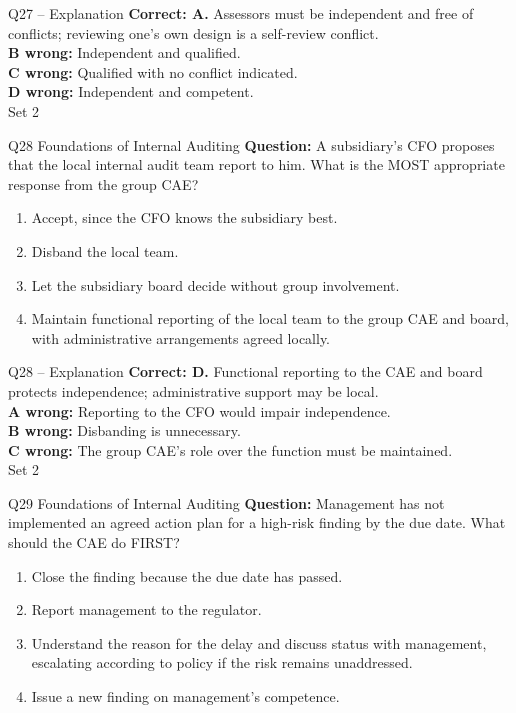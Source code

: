 \documentclass[aspectratio=169,10pt]{beamer}
\begin{document}
\begin{frame}[t]{Q27 -- Explanation}
	\footnotesize
	\textbf{Correct: A.} Assessors must be independent and free of conflicts; reviewing one's own design is a self-review conflict. \\[5pt]
\textbf{B wrong:} Independent and qualified. \\[3pt]
\textbf{C wrong:} Qualified with no conflict indicated. \\[3pt]
\textbf{D wrong:} Independent and competent. \\[3pt]
	\vfill {\tiny Set 2}
\end{frame}

\begin{frame}[t]{Q28 \hfill {\scriptsize Foundations of Internal Auditing}}
	\small
	\textbf{Question:} A subsidiary's CFO proposes that the local internal audit team report to him. What is the MOST appropriate response from the group CAE?
	\begin{enumerate}[label=\Alph*.,itemsep=1pt,topsep=3pt]
			\item Accept, since the CFO knows the subsidiary best.
			\item Disband the local team.
			\item Let the subsidiary board decide without group involvement.
			\item Maintain functional reporting of the local team to the group CAE and board, with administrative arrangements agreed locally.
	\end{enumerate}
\end{frame}

\begin{frame}[t]{Q28 -- Explanation}
	\footnotesize
	\textbf{Correct: D.} Functional reporting to the CAE and board protects independence; administrative support may be local. \\[5pt]
\textbf{A wrong:} Reporting to the CFO would impair independence. \\[3pt]
\textbf{B wrong:} Disbanding is unnecessary. \\[3pt]
\textbf{C wrong:} The group CAE's role over the function must be maintained. \\[3pt]
	\vfill {\tiny Set 2}
\end{frame}

\begin{frame}[t]{Q29 \hfill {\scriptsize Foundations of Internal Auditing}}
	\small
	\textbf{Question:} Management has not implemented an agreed action plan for a high-risk finding by the due date. What should the CAE do FIRST?
	\begin{enumerate}[label=\Alph*.,itemsep=1pt,topsep=3pt]
			\item Close the finding because the due date has passed.
			\item Report management to the regulator.
			\item Understand the reason for the delay and discuss status with management, escalating according to policy if the risk remains unaddressed.
			\item Issue a new finding on management's competence.
	\end{enumerate}
\end{frame}
\end{document}
